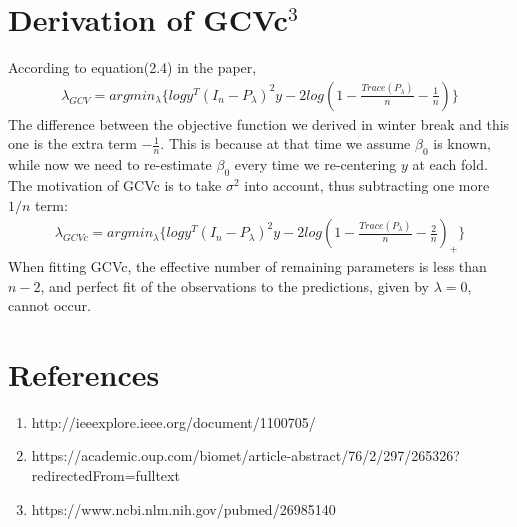 \documentclass{article}
\begin{document}

\section{Derivation of GCVc$^{3}$}
According to equation(2.4) in the paper,
\begin{align}
\lambda_{GCV}=argmin_{\lambda}\{log y^T(I_n-P_{\lambda})^2y-2log(1-\frac{Trace(P_{\lambda})}{n}-\frac{1}{n})\}
\end{align}
The difference between the objective function we derived in winter break and this one is the extra term $-\frac{1}{n}$. This is because at that time we assume $\beta_0$ is known, while now we need to re-estimate $\beta_0$ every time we re-centering $y$ at each fold.\\

The motivation of GCVc is to take $\sigma^2$ into account, thus subtracting one more $1/n$ term:
\begin{align}
\lambda_{GCVc}=argmin_{\lambda}\{log y^T(I_n-P_{\lambda})^2y-2log(1-\frac{Trace(P_{\lambda})}{n}-\frac{2}{n})_+\}
\end{align}
When fitting GCVc, the effective number of remaining parameters is less than $n-2$, and perfect fit of the observations to the predictions, given by $\lambda=0$, cannot occur.


\section{References}
\begin{enumerate}[1.]
\item http://ieeexplore.ieee.org/document/1100705/
\item https://academic.oup.com/biomet/article-abstract/76/2/297/265326?redirectedFrom=fulltext
\item https://www.ncbi.nlm.nih.gov/pubmed/26985140
\end{enumerate}


\end{document}

